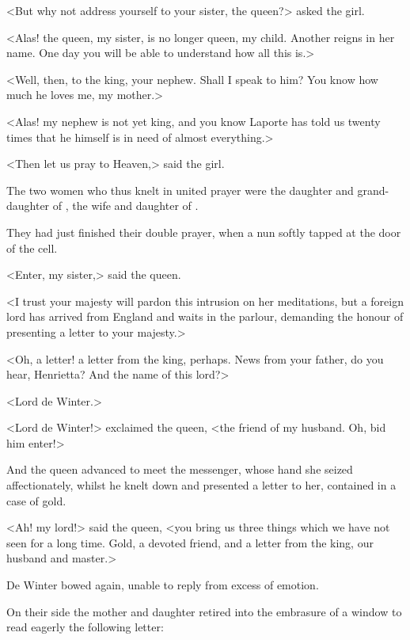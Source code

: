 <But why not address yourself to your sister, the queen?> asked the girl.

<Alas! the queen, my sister, is no longer queen, my child. Another reigns in her name. One day you will be able to understand how all this is.>

<Well, then, to the king, your nephew. Shall I speak to him? You know how much he loves me, my mother.>

<Alas! my nephew is not yet king, and you know Laporte has told us twenty times that he himself is in need of almost everything.>

<Then let us pray to Heaven,> said the girl.

The two women who thus knelt in united prayer were the daughter and grand-daughter of , the wife and daughter of .

They had just finished their double prayer, when a nun softly tapped at the door of the cell.

<Enter, my sister,> said the queen.

<I trust your majesty will pardon this intrusion on her meditations, but a foreign lord has arrived from England and waits in the parlour, demanding the honour of presenting a letter to your majesty.>

<Oh, a letter! a letter from the king, perhaps. News from your father, do you hear, Henrietta? And the name of this lord?>

<Lord de Winter.>

<Lord de Winter!> exclaimed the queen, <the friend of my husband. Oh, bid him enter!>

And the queen advanced to meet the messenger, whose hand she seized affectionately, whilst he knelt down and presented a letter to her, contained in a case of gold.

<Ah! my lord!> said the queen, <you bring us three things which we have not seen for a long time. Gold, a devoted friend, and a letter from the king, our husband and master.>

De Winter bowed again, unable to reply from excess of emotion.

On their side the mother and daughter retired into the embrasure of a window to read eagerly the following letter:  

